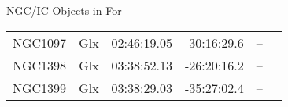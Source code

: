 \begin{block}{NGC/IC Objects in For}
  \centering
  \begin{tabularx}{\textwidth}{llrrll} \toprule 
    NGC1097 & Glx & 02:46:19.05 & -30:16:29.6  & -- \\ 
    NGC1398 & Glx & 03:38:52.13 & -26:20:16.2  & -- \\ 
    NGC1399 & Glx & 03:38:29.03 & -35:27:02.4  & -- \\ 
  \end{tabularx}
\end{block}